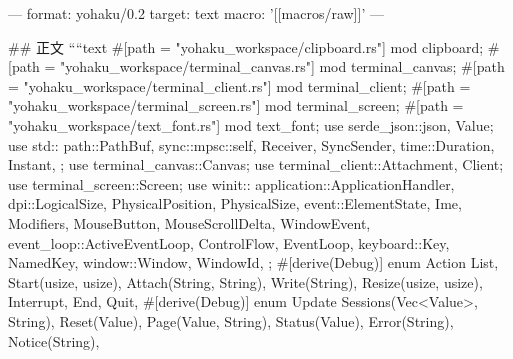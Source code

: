 ---
format: yohaku/0.2
target: text
macro: '[[macros/raw]]'
---

## 正文
````text
#[path = "yohaku_workspace/clipboard.rs"]
mod clipboard;
#[path = "yohaku_workspace/terminal_canvas.rs"]
mod terminal_canvas;
#[path = "yohaku_workspace/terminal_client.rs"]
mod terminal_client;
#[path = "yohaku_workspace/terminal_screen.rs"]
mod terminal_screen;
#[path = "yohaku_workspace/text_font.rs"]
mod text_font;
use serde_json::{json, Value};
use std::{
    path::PathBuf,
    sync::mpsc::{self, Receiver, SyncSender},
    time::{Duration, Instant},
};
use terminal_canvas::Canvas;
use terminal_client::{Attachment, Client};
use terminal_screen::Screen;
use winit::{
    application::ApplicationHandler,
    dpi::{LogicalSize, PhysicalPosition, PhysicalSize},
    event::{ElementState, Ime, Modifiers, MouseButton, MouseScrollDelta, WindowEvent},
    event_loop::{ActiveEventLoop, ControlFlow, EventLoop},
    keyboard::{Key, NamedKey},
    window::{Window, WindowId},
};
#[derive(Debug)]
enum Action {
    List,
    Start(usize, usize),
    Attach(String, String),
    Write(String),
    Resize(usize, usize),
    Interrupt,
    End,
    Quit,
}
#[derive(Debug)]
enum Update {
    Sessions(Vec<Value>, String),
    Reset(Value),
    Page(Value, String),
    Status(Value),
    Error(String),
    Notice(String),
}
